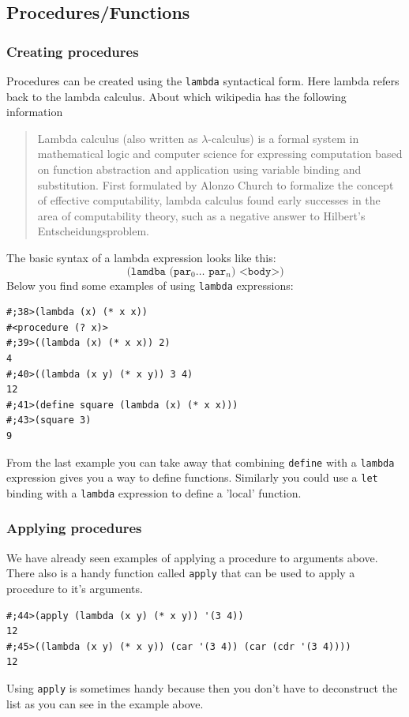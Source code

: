 \documentclass[12pt,a4paper,english,twoside]{article}
\begin{document}
\subsection{Procedures/Functions}
\subsubsection{Creating procedures}
Procedures can be created using the \texttt{lambda} syntactical form. Here 
lambda refers back to the lambda calculus. About which wikipedia \cite{lambda} 
has the following information
\begin{quotation}
Lambda calculus (also written as $\lambda$-calculus) is a formal system in 
mathematical logic and computer science for expressing computation based on 
function abstraction and application using variable binding and substitution. 
First formulated by Alonzo Church to formalize the concept of effective 
computability, lambda calculus found early successes in the area of 
computability theory, such as a negative answer to Hilbert's 
Entscheidungsproblem.
\end{quotation}
The basic syntax of a lambda expression looks like this:
\begin{equation*}
\texttt{(lamdba (par$_{0} \dots$ par$_{n}$) <body>)}
\end{equation*}
Below you find some examples of using \texttt{lambda} expressions:
\begin{lstlisting}
#;38>(lambda (x) (* x x))
#<procedure (? x)>
#;39>((lambda (x) (* x x)) 2)
4 
#;40>((lambda (x y) (* x y)) 3 4)
12
#;41>(define square (lambda (x) (* x x)))
#;43>(square 3)
9
\end{lstlisting}
From the last example you can take away that combining \texttt{define} with a 
\texttt{lambda} expression gives you a way to define functions. Similarly you 
could use a \texttt{let} binding with a \texttt{lambda} expression to define a 
'local' function.
\subsubsection{Applying procedures}
We have already seen examples of applying a procedure to arguments above. 
There also is a handy function called \texttt{apply} that can be used to apply 
a procedure to it's arguments.
\begin{lstlisting}
#;44>(apply (lambda (x y) (* x y)) '(3 4))
12
#;45>((lambda (x y) (* x y)) (car '(3 4)) (car (cdr '(3 4))))
12
\end{lstlisting} Using \texttt{apply} is sometimes handy because then you 
don't have to deconstruct the list as you can see in the example above.
\end{document}
